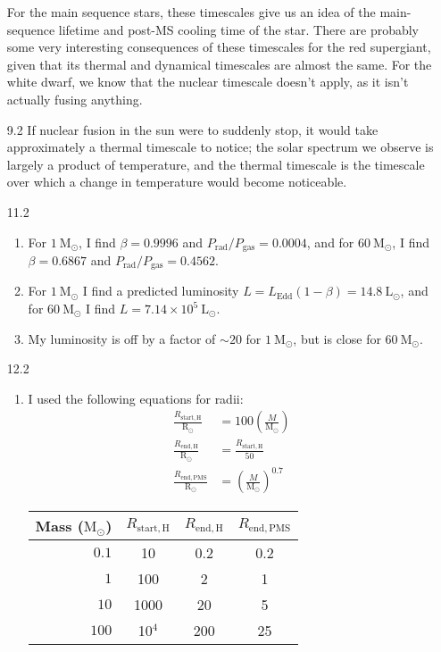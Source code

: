 \documentclass[11pt]{article}
\newcommand\lsol{\mathrm{L}_\odot}
\newcommand\rsol{\mathrm{R}_\odot}
\newcommand\msol{\mathrm{M}_\odot}
\begin{document}
\begin{enumerate}
    For the main sequence stars, these timescales give us an idea of the main-sequence lifetime and post-MS cooling time of the star. There are probably some very interesting consequences of these timescales for the red supergiant, given that its thermal and dynamical timescales are almost the same. For the white dwarf, we know that the nuclear timescale doesn't apply, as it isn't actually fusing anything.

\item [9.2]
    If nuclear fusion in the sun were to suddenly stop, it would take approximately a thermal timescale to notice; the solar spectrum we observe is largely a product of temperature, and the thermal timescale is the timescale over which a change in temperature would become noticeable.

\item [11.2]
	\begin{enumerate}
	
    \item For $1~\msol$, I find $\beta = 0.9996$ and $P_\mathrm{rad}/P_\mathrm{gas} = 0.0004$, and for $60~\msol$, I find $\beta = 0.6867$ and $P_\mathrm{rad}/P_\mathrm{gas} = 0.4562$.
    
    \item For $1~\msol$ I find a predicted luminosity $L = L_\mathrm{Edd}(1-\beta) = 14.8~\lsol$, and for $60~\msol$ I find $L = 7.14\times10^5~\lsol$.
    
    \item My luminosity is off by a factor of $\sim\!20$ for $1~\msol$, but is close for $60~\msol$.
    
    \end{enumerate}

\item [12.2] %
	\begin{enumerate}
    
    \item I used the following equations for radii:
    \begin{align}
    \frac{R_\mathrm{start,H}}{\rsol} &= 100 \left( \frac{M}{\msol} \right) \\
    \frac{R_\mathrm{end,H}}{\rsol} &= \frac{R_\mathrm{start,H}}{50} \\
    \frac{R_\mathrm{end,PMS}}{\rsol} &= \left( \frac{M}{\msol} \right)^{0.7}
    \end{align}
    
    	\begin{table}[H]
        \centering
        \begin{tabular}{ r | c | c | c }
          Mass ($\msol$) & $R_\mathrm{start,H}$ & $R_\mathrm{end,H}$ & $R_\mathrm{end,PMS}$ \\ \hline
          $0.1$ & 10 & 0.2 & 0.2 \\
          $1$ & 100 & 2 & 1 \\
          $10$ & 1000 & 20 & 5 \\
          $100$ & 10$^4$ & 200 & 25 \\
        \end{tabular}
        \end{table}


\end{enumerate}
\end{enumerate}
\end{document}
